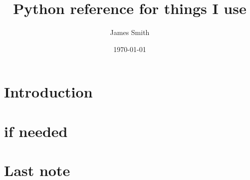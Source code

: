 \documentclass{book}
\begin{document}
\frontmatter

\title{Python reference for things I use}
\author{James Smith}
\date{\today}
\maketitle

\chapter{Introduction}

\mainmatter%


\appendix
\chapter{if needed}

\backmatter%
\chapter{Last note}
\end{document}
